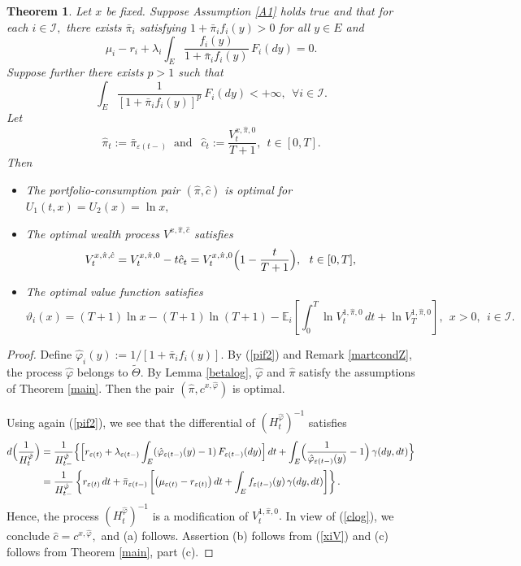 \documentclass[11pt]{article}
\theoremstyle{plain}
\newtheorem{theorem}{Theorem}[section]
\theoremstyle{definition}
\numberwithin{equation}{section}
\newcommand{\calI}{\mathcal{I}}
\newcommand{\eps}{\varepsilon}
\newcommand{\Exp}{\mathds{E}}
\begin{document}
\begin{theorem}\label{thmlog}
Let $x$ be fixed. Suppose  Assumption \ref{A1} holds true and that for each $i\in\calI,$ there exists $\bar{\pi}_i$ satisfying $1+\bar{\pi}_if_i(y)>0$ for all $y\in E$ and
\begin{equation}\label{pif2}
\mu_i-r_i+\lambda_i\int_E \frac{f_i(y)}{1+\bar\pi_i f_i(y)}\,F_i(dy)=0.
\end{equation}
Suppose further there exists $p>1$ such that
\[
\int_E \frac{1}{[1+\bar\pi_i f_i(y)]^{p}}\,F_i(dy)<+\infty, \ \ \forall i\in\calI.
\]
Let
\[
\hat{\pi}_t:=\bar\pi_{\eps(t-)} \ \mbox{ and } \ \ \hat{c}_t:=\frac{V_t^{x,\hat{\pi},0}}{T+1}, \ \ t\in [0,T].
\]
Then
\begin{itemize}
   \item[(a)] The portfolio-consumption pair $(\hat{\pi},\hat{c})$ is optimal for $U_1(t,x)=U_2(x)=\ln x,$

 \item[(b)] The optimal wealth process $V^{x,\hat{\pi},\hat{c}}$ satisfies
 \[
 V^{x,\hat{\pi},\hat{c}}_t=V_t^{x,\hat{\pi},0}-t\hat{c}_t=V_t^{x,\hat{\pi},0}\Bigl(1-\frac{t}{T+1}\Bigr), \ \ t\in [0,T],
 \]

 \item[(c)] The optimal value function satisfies
\[
\vartheta_i(x)=(T+1)\ln x-(T+1)\ln (T+1)-\Exp_i\left[\int_0^T\ln V_t^{1,\hat{\pi},0}\,dt+\ln V_T^{1,\hat{\pi},0}\right], \ \ x>0, \ \ i\in\calI.
\]
\end{itemize}
\end{theorem}
\begin{proof}
 Define $\hat\varphi_i(y):=1/[1+\bar{\pi}_if_i(y)].$ By (\ref{pif2}) and Remark \ref{martcondZ}, the process $\hat{\varphi}$ belongs to $\tilde{\Theta}.$ By Lemma \ref{betalog}, $\hat\varphi$ and $\hat\pi$ satisfy the assumptions of Theorem \ref{main}. Then the pair $(\hat\pi,c^{x,\hat{\varphi}})$ is optimal.

Using again (\ref{pif2}), we see that the differential of $(H_t^{\hat{\varphi}})^{-1}$ satisfies
\begin{align*}
  d\Bigl(\frac{1}{H^{\hat{\varphi}}_t}\Bigr)
  &=\frac{1}{H^{\hat{\varphi}}_{t-}}\Bigl\{\Bigl[r_{\eps(t)}
  +\lambda_{\eps(t-)}\int_E(\hat{\varphi}_{\eps(t-)}(y)-1)\,F_{\eps(t-)}(dy)\Bigr]\,dt+\int_E\Bigl(\frac{1}{\hat{\varphi}_{\eps(t-)}(y)}-1\Bigr)\,\gamma(dy,dt)\Bigr\}\\
  &=\frac{1}{H^{\hat{\varphi}}_{t-}}\left\{r_{\eps(t)}\,dt+\bar\pi_{\eps(t-)}\left[\bigl(\mu_{\eps(t)}-r_{\eps(t)}\bigr)\,dt+\int_{E} f_{\eps(t-)}(y)\,\gamma(dy,dt)\right]\right\}.
\end{align*}
Hence, the process $(H_t^{\hat{\varphi}})^{-1}$ is a modification of $V_t^{1,\hat{\pi},0}.$ In view of (\ref{clog}), we conclude  $\hat{c}=c^{x,\hat{\varphi}},$ and (a) follows. Assertion (b) follows from (\ref{xiV}) and (c) follows from Theorem \ref{main}, part (c).
\end{proof}
\end{document}
